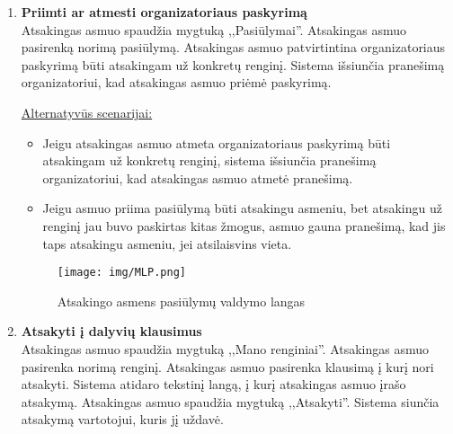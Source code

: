 \documentclass{VUMIFPSkursinis}
\begin{document}
\begin{enumerate} [label = \textbf{U\arabic*.}]
				\underline{Alternatyvūs scenarijai:}
				\begin{itemize}
					\item Jeigu nėra prašančiųjų dalyvauti, sistemoje iššoka langas sakantis organizatoriui, jog nėra naujų patvirtinimų.
					\item Jeigu dalyvis yra priimamas į renginį, bet nebėra vietų dalyvauti, jam išsiunčiama žinutė, jog jei atsiras laisvų vietų, jis bus priimtas į renginį.
				\end{itemize}
				
				\begin{figure}[H]
					\centering
					\texttt{[image: img/MLP.png]}
					\caption{Prašymo dalyvauti peržiūra}
					\label{fig:priimti-dalyvi}
				\end{figure}

			\item \textbf{Priimti ar atmesti organizatoriaus paskyrimą} \\
				Atsakingas asmuo spaudžia mygtuką ,,Pasiūlymai''. 
				Atsakingas asmuo pasirenką norimą pasiūlymą.
				Atsakingas asmuo patvirtintina organizatoriaus paskyrimą būti atsakingam už konkretų renginį. 
				Sistema išsiunčia pranešimą organizatoriui, kad atsakingas asmuo priėmė paskyrimą.
				
				\underline{Alternatyvūs scenarijai:}
				\begin{itemize}
					\item Jeigu atsakingas asmuo atmeta organizatoriaus paskyrimą būti atsakingam už konkretų renginį, sistema išsiunčia pranešimą organizatoriui, kad atsakingas asmuo atmetė pranešimą.
					\item Jeigu asmuo priima pasiūlymą būti atsakingu asmeniu, bet atsakingu už renginį jau buvo paskirtas kitas žmogus, asmuo gauna pranešimą, kad jis taps atsakingu asmeniu, jei atsilaisvins vieta.
				\end{itemize}

				\begin{figure}[H]
					\centering
					\texttt{[image: img/MLP.png]}
					\caption{Atsakingo asmens pasiūlymų valdymo langas}
					\label{fig:pasiulymu-sarasas}
				\end{figure}
			\item \textbf{Atsakyti į dalyvių klausimus}   \\
					Atsakingas asmuo spaudžia mygtuką ,,Mano renginiai''. 
					Atsakingas asmuo pasirenka norimą renginį.
					Atsakingas asmuo pasirenka klausimą į kurį nori atsakyti. 
					Sistema atidaro tekstinį langą, į kurį atsakingas asmuo įrašo atsakymą. 
					Atsakingas asmuo spaudžia mygtuką ,,Atsakyti''.
					Sistema siunčia atsakymą vartotojui, kuris jį uždavė.
					

\end{enumerate}
\end{document}
